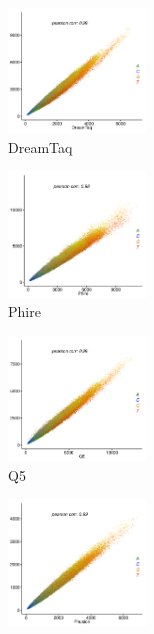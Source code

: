 \documentclass[parskip=full, numbers=noenddot]{scrreprt}
\begin{document}
\begin{figure}[htpb]
  \centering
  \begin{subfigure}[htpb]{0.4\textwidth}
    \centering
    \includegraphics[width=0.4\textwidth]{kmer_dreamtaq}
    \caption{DreamTaq}
    \label{fig:kmer_enz_dreamtaq}
  \end{subfigure}
  \begin{subfigure}[htpb]{0.4\textwidth}
    \centering
    \includegraphics[width=0.4\textwidth]{kmer_phire}
    \caption{Phire}
    \label{fig:kmer_enz_phire}
  \end{subfigure}
  \begin{subfigure}[htpb]{0.4\textwidth}
    \centering
    \includegraphics[width=0.4\textwidth]{kmer_q5}
    \caption{Q5}
    \label{fig:kmer_enz_q5}
  \end{subfigure}
  \begin{subfigure}[htpb]{0.4\textwidth}
    \centering
    \includegraphics[width=0.4\textwidth]{kmer_phusion}

\end{subfigure}
\end{figure}
\end{document}
